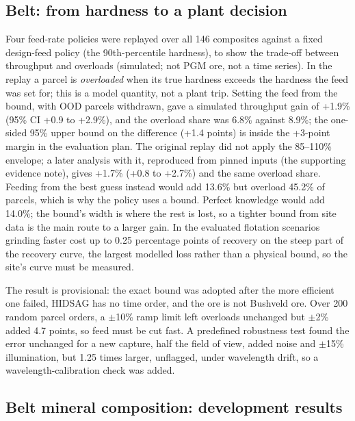 \documentclass[10pt,a4paper,twocolumn]{article}
\begin{document}
\subsection{Belt: from hardness to a plant decision}\label{sec:beltdecision}



Four feed-rate policies were replayed over all 146 composites against a fixed design-feed policy (the 90th-percentile hardness), to show the trade-off between throughput and overloads (simulated; not PGM ore, not a time series). In the replay a parcel is \emph{overloaded} when its true hardness exceeds the hardness the feed was set for; this is a model quantity, not a plant trip. Setting the feed from the bound, with OOD parcels withdrawn, gave a simulated throughput gain of +1.9\% (95\% CI +0.9 to +2.9\%), and the overload share was 6.8\% against 8.9\%; the one-sided 95\% upper bound on the difference (+1.4 points) is inside the +3-point margin in the evaluation plan. The original replay did not apply the 85--110\% envelope; a later analysis with it, reproduced from pinned inputs (the supporting evidence note), gives +1.7\% (+0.8 to +2.7\%) and the same overload share. Feeding from the best guess instead would add 13.6\% but overload 45.2\% of parcels, which is why the policy uses a bound. Perfect knowledge would add 14.0\%; the bound's width is where the rest is lost, so a tighter bound from site data is the main route to a larger gain. In the evaluated flotation scenarios grinding faster cost up to 0.25 percentage points of recovery on the steep part of the recovery curve, the largest modelled loss rather than a physical bound, so the site's curve must be measured.


The result is provisional: the exact bound was adopted after the more efficient one failed, HIDSAG has no time order, and the ore is not Bushveld ore. Over 200 random parcel orders, a $\pm$10\% ramp limit left overloads unchanged but $\pm$2\% added 4.7 points, so feed must be cut fast. A predefined robustness test found the error unchanged for a new capture, half the field of view, added noise and $\pm$15\% illumination, but 1.25 times larger, unflagged, under wavelength drift, so a wavelength-calibration check was added.

\subsection{Belt mineral composition: development results}\label{sec:minerals}
\end{document}
